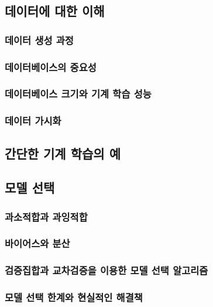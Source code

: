 \documentclass [12pt] {oblivoir}
\let\oldsubsubsection=\subsubsection
\renewcommand{\subsubsection}
{
  \filbreak
  \oldsubsubsection
}
\begin{document}
\subsection{데이터에 대한 이해}

\subsubsection{데이터 생성 과정}

\subsubsection{데이터베이스의 중요성}

\subsubsection{데이터베이스 크기와 기계 학습 성능}

\subsubsection{데이터 가시화}

\subsection{간단한 기계 학습의 예}

\subsection{모델 선택}

\subsubsection{과소적합과 과잉적합}

\subsubsection{바이어스와 분산}

\subsubsection{검증집합과 교차검증을 이용한 모델 선택 알고리즘}

\subsubsection{모델 선택 한계와 현실적인 해결책}
\end{document}
